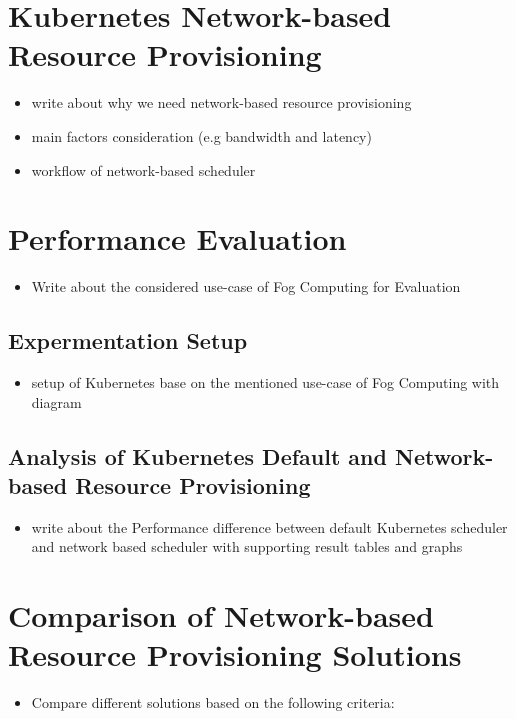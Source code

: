 \section{Kubernetes Network-based Resource Provisioning}
\label{sec: k8s_ns}
\begin{itemize}
  \item write about why we need network-based resource provisioning
  \item main factors consideration (e.g bandwidth and latency)
  \item workflow of network-based scheduler
\end{itemize}

\section{Performance Evaluation}
\label{sec:Performance_eval}
\begin{itemize}
  \item Write about the considered use-case of Fog Computing for Evaluation
\end{itemize}
\subsection{Expermentation Setup}
\label{sec:setup}
\begin{itemize}
  \item setup of Kubernetes base on the mentioned use-case of Fog Computing with diagram
\end{itemize}

\subsection{Analysis of Kubernetes Default and Network-based Resource Provisioning}
\label{sec:analysis}
\begin{itemize}
  \item write about the Performance difference between default Kubernetes scheduler and network based scheduler with supporting result tables and graphs
\end{itemize}

\section{Comparison of Network-based Resource Provisioning Solutions}
\label{sec:related_work}
\begin{itemize}
  \item Compare different solutions based on the following criteria:
\end{itemize}

